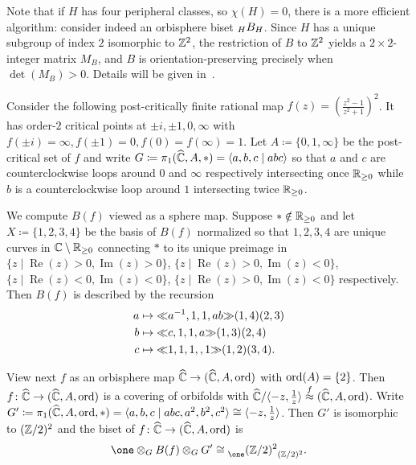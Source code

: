 \documentclass{amsart}
\begin{document}
Note that if $H$ has four peripheral classes, so $\chi(H)=0$, there is
a more efficient algorithm: consider indeed an orbisphere biset
$\subscript H B_H$. Since $H$ has a unique subgroup of index $2$
isomorphic to ${\mathbb Z}^2$, the restriction of $B$ to ${\mathbb Z}^2$ yields a
$2\times2$-integer matrix $M_B$, and $B$ is orientation-preserving
precisely when $\det(M_B)>0$. Details will be given
in~\cite{bartholdi-dudko:bc3}.

\begin{exple}\label{ex:positive orbisphere}
  Consider the following post-critically finite rational map
  $f(z)=\left(\frac{z^2-1}{z^2+1}\right)^2$. It has order-$2$ critical
  points at $\pm i, \pm 1, 0, \infty$ with
  $f(\pm i)=\infty, f(\pm 1)=0, f(0)=f(\infty)=1$. Let
  $A\coloneqq \{0,1, \infty\}$ be the post-critical set of $f$ and
  write $G\coloneqq \pi_1({\widehat{{\mathbb C}}},A,*)=\langle a, b, c \mid a b c \rangle$
  so that $a$ and $c$ are counterclockwise loops around $0$ and
  $\infty$ respectively intersecting once ${\mathbb R}_{\ge0}$ while $b$ is a
  counterclockwise loop around $1$ intersecting twice ${\mathbb R}_{\ge0}$.
  
  We compute $B(f)$ viewed as a sphere map. Suppose $*\notin
  {\mathbb R}_{\ge0}$ and let $X\coloneqq\{1,2,3,4\}$ be the basis of $B(f)$
  normalized so that $1,2,3,4$ are unique curves in ${\mathbb C}\setminus
  {\mathbb R}_{\ge0}$ connecting $*$ to its unique preimage in $\{z\mid
  \operatorname{Re}(z)>0,\operatorname{Im}(z)>0\}$, $\{z\mid
  \operatorname{Re}(z)>0,\operatorname{Im}(z)<0\}$, $\{z\mid
  \operatorname{Re}(z)<0,\operatorname{Im}(z)<0\}$, $\{z\mid
  \operatorname{Re}(z)>0,\operatorname{Im}(z)<0\}$ respectively. Then
  $B(f)$ is described by the recursion
  \begin{equation}
    \begin{aligned}
      a &\mapsto {\ll}a^{-1},1,1,ab{\gg}(1,4)(2,3)\\
      b &\mapsto {\ll}c,1,1,a{\gg}(1,3)(2,4)\\
      c &\mapsto {\ll}1,1,1,,1{\gg}(1,2)(3,4).
    \end{aligned}
  \end{equation}

  View next $f$ as an orbisphere map ${\widehat{{\mathbb C}}}\to ({\widehat{{\mathbb C}}}, A,\operatorname{ord})$ with
  $\operatorname{ord}(A)=\{2\}$. Then $f\colon {\widehat{{\mathbb C}}}\to ({\widehat{{\mathbb C}}}, A,\operatorname{ord})$ is a covering
  of orbifolds with
  ${\widehat{{\mathbb C}}}/{\langle -z, \frac{1}{z}\rangle}\overset{f}{\approx}
  ({\widehat{{\mathbb C}}},A,\operatorname{ord})$. Write
  $G'\coloneqq \pi_1({\widehat{{\mathbb C}}}, A,\operatorname{ord}, *)=\langle a, b, c \mid
  a b c,a^2,b^2,c^2\rangle \cong\langle -z, \frac{1}{z}\rangle$. Then
  $G'$ is isomorphic to $({\mathbb Z}/2)^{2}$ and the biset of
  $f\colon {\widehat{{\mathbb C}}}\to ({\widehat{{\mathbb C}}}, A,\operatorname{ord})$ is
  \[\one \otimes_{G} B(f) \otimes_G  G' \cong \subscript{\one}{(\Z/2)^{2}}_{(\Z/2)^{2}}.\]


\end{exple}
\end{document}
